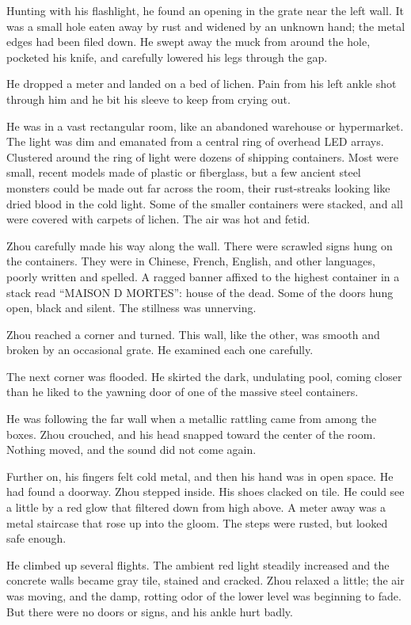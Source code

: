 \documentclass[10pt,a4paper]{article}
\begin{document}
Hunting with his flashlight, he found an opening in the grate near
the left wall. It was a small hole eaten away by rust and widened by
an unknown hand; the metal edges had been filed down. He swept away
the muck from around the hole, pocketed his knife, and carefully
lowered his legs through the gap.

He dropped a meter and landed on a bed of lichen. Pain from his left
ankle shot through him and he bit his sleeve to keep from crying out.

He was in a vast rectangular room, like an abandoned warehouse or
hypermarket. The light was dim and emanated from a central ring of
overhead LED arrays. Clustered around the ring of light were dozens
of shipping containers. Most were small, recent models made of
plastic or fiberglass, but a few ancient steel monsters could be made
out far across the room, their rust-streaks looking like dried blood
in the cold light. Some of the smaller containers were stacked, and
all were covered with carpets of lichen. The air was hot and fetid.

Zhou carefully made his way along the wall. There were scrawled
signs hung on the containers. They were in Chinese, French, English,
and other languages, poorly written and spelled. A ragged banner
affixed to the highest container in a stack read ``MAISON D MORTES'':
house of the dead. Some of the doors hung open, black and silent. The
stillness was unnerving.

Zhou reached a corner and turned. This wall, like the other,
was smooth and broken by an occasional grate. He examined each
one carefully.

The next corner was flooded. He skirted the dark, undulating pool,
coming closer than he liked to the yawning door of one of the
massive steel containers.

He was following the far wall when a metallic rattling came from
among the boxes. Zhou crouched, and his head snapped toward the
center of the room. Nothing moved, and the sound did not come again.

Further on, his fingers felt cold metal, and then his hand was in
open space. He had found a doorway. Zhou stepped inside. His shoes
clacked on tile. He could see a little by a red glow that filtered
down from high above. A meter away was a metal staircase that rose
up into the gloom. The steps were rusted, but looked safe enough.

He climbed up several flights. The ambient red light steadily
increased and the concrete walls became gray tile, stained and
cracked. Zhou relaxed a little; the air was moving, and the damp,
rotting odor of the lower level was beginning to fade. But there
were no doors or signs, and his ankle hurt badly.
\end{document}
